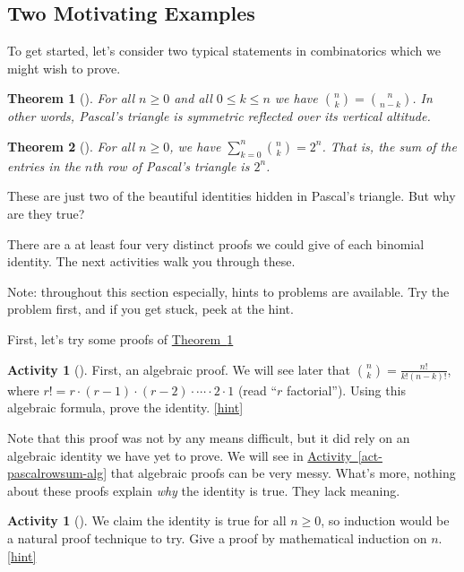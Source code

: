 \documentclass[10pt,]{book}
\theoremstyle{plain}
\newtheorem{theorem}{Theorem}[section]
\theoremstyle{definition}
\theoremstyle{definition}
\theoremstyle{definition}
\newtheorem{activity}[project]{Activity}
\numberwithin{equation}{chapter}
\begin{document}
\subsection[{Two Motivating Examples}]{Two Motivating Examples}\label{subsec-basic-proofs-examples}
\hypertarget{p-545}{}%
To get started, let's consider two typical statements in combinatorics which we might wish to prove.%
\begin{theorem}[{}]\label{thm-pascalsym}
\hypertarget{p-546}{}%
For all \(n \ge 0\) and all \(0 \le k \le n\) we have \(\binom{n}{k} = \binom{n}{n-k}\).  In other words, Pascal's triangle is symmetric reflected over its vertical altitude.%
\end{theorem}
\begin{theorem}[{}]\label{thm-pascalrowsum}
\hypertarget{p-547}{}%
For all \(n \ge 0\), we have \(\sum_{k=0}^n \binom{n}{k} = 2^n\).  That is, the sum of the entries in the \(n\)th row of Pascal's triangle is \(2^n\).%
\end{theorem}
\hypertarget{p-548}{}%
These are just two of the beautiful identities hidden in Pascal's triangle.  But why are they true?%
\par
\hypertarget{p-549}{}%
There are a at least four very distinct proofs we could give of each binomial identity.  The next activities walk you through these.%
\par
\hypertarget{p-550}{}%
Note: throughout this section especially, hints to problems are available.  Try the problem first, and if you get stuck, peek at the hint.%
\par
\hypertarget{p-551}{}%
First, let's try some proofs of \hyperref[thm-pascalsym]{Theorem~\ref{thm-pascalsym}}%
\begin{activity}[]\label{activity-65}
\hypertarget{p-552}{}%
First, an algebraic proof.  We will see later that \(\binom{n}{k} = \frac{n!}{k!(n-k)!}\), where \(r! = r \cdot (r-1) \cdot (r-2) \cdot\cdots\cdot 2\cdot 1\) (read ``\(r\) factorial'').  Using this algebraic formula, prove the identity.%
\hfill{\tiny\hyperlink{a-72}{[hint]}\hypertarget{q-72}{}}\end{activity}
\hypertarget{p-554}{}%
Note that this proof was not by any means difficult, but it did rely on an algebraic identity we have yet to prove.  We will see in \hyperref[act-pascalrowsum-alg]{Activity~\ref{act-pascalrowsum-alg}} that algebraic proofs can be very messy.  What's more, nothing about these proofs explain \emph{why} the identity is true.  They lack meaning.%
\begin{activity}[]\label{activity-66}
\hypertarget{p-555}{}%
We claim the identity is true for all \(n \ge 0\), so induction would be a natural proof technique to try.  Give a proof by mathematical induction on \(n\).%
\hfill{\tiny\hyperlink{a-73}{[hint]}\hypertarget{q-73}{}}\end{activity}
\end{document}
